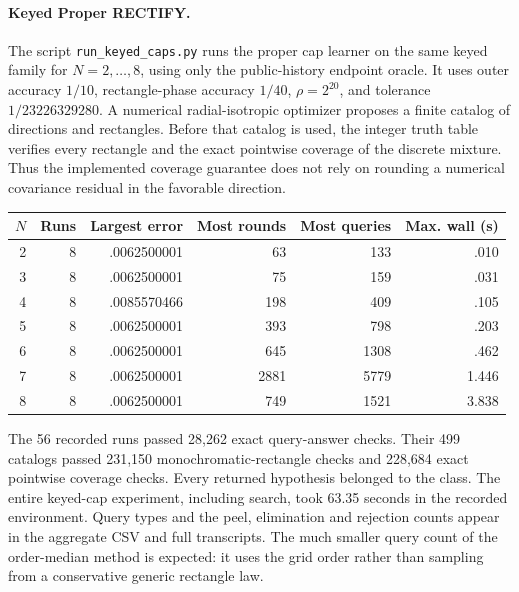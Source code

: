 \paragraph{Keyed Proper RECTIFY.}
The script \texttt{run\_keyed\_caps.py} runs the proper cap learner on the same keyed family for $N=2,\ldots,8$, using only the public-history endpoint oracle. It uses outer accuracy $1/10$, rectangle-phase accuracy $1/40$, $\rho=2^{20}$, and tolerance $1/23226329280$. A numerical radial-isotropic optimizer proposes a finite catalog of directions and rectangles. Before that catalog is used, the integer truth table verifies every rectangle and the exact pointwise coverage of the discrete mixture. Thus the implemented coverage guarantee does not rely on rounding a numerical covariance residual in the favorable direction.

\begin{center}\small
\begin{tabular}{rrrrrr}
\toprule
$N$&Runs&Largest error&Most rounds&Most queries&Max. wall (s)\\
\midrule
2&8&.0062500001&63&133&.010\\
3&8&.0062500001&75&159&.031\\
4&8&.0085570466&198&409&.105\\
5&8&.0062500001&393&798&.203\\
6&8&.0062500001&645&1308&.462\\
7&8&.0062500001&2881&5779&1.446\\
8&8&.0062500001&749&1521&3.838\\
\bottomrule
\end{tabular}
\end{center}
The 56 recorded runs passed 28,262 exact query-answer checks. Their 499 catalogs passed 231,150 monochromatic-rectangle checks and 228,684 exact pointwise coverage checks. Every returned hypothesis belonged to the class. The entire keyed-cap experiment, including search, took 63.35 seconds in the recorded environment. Query types and the peel, elimination and rejection counts appear in the aggregate CSV and full transcripts. The much smaller query count of the order-median method is expected: it uses the grid order rather than sampling from a conservative generic rectangle law.

